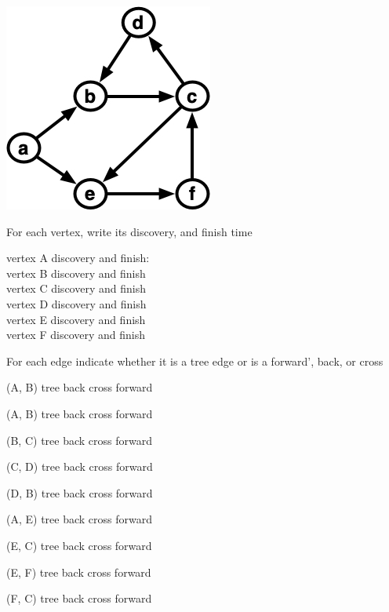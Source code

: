 \vspace{.1in}
\noindent
\begin{minipage}{.45\textwidth}
\begin{center}
  \includegraphics[scale=.45]{media/dfs-numbers.jpg}\\[.2in]
\end{center}
\end{minipage}

\begin{problem}
For each vertex, write its discovery, and finish time


\ask vertex A discovery and  finish: ~~ ~~ 
\\
\ask vertex B  discovery and  finish ~~  ~~ 
\\
\ask vertex C discovery and finish   ~~ ~~ 
\\
\ask vertex D discovery and finish ~~  ~~
\\
\ask vertex E discovery and finish ~ ~~ 
\\
\ask vertex F discovery and finish ~~ ~~ 
\end{problem}


\begin{problem}[9.]

For each edge indicate whether it is a tree edge or is a
forward', back, or cross

\anychoice
(A, B)
\choice* tree
\choice back
\choice cross
\choice forward

\anychoice
(A, B) 
\choice* tree
\choice back
\choice cross
\choice forward

\anychoice (B, C)
\choice* tree
\choice back
\choice cross
\choice forward

\anychoice (C, D)
\choice* tree
\choice back
\choice cross
\choice forward

\anychoice (D, B)
\choice* tree
\choice back
\choice cross
\choice forward

\anychoice (A, E) 
\choice* tree
\choice back
\choice cross
\choice forward

\anychoice (E, C) 
\choice tree
\choice back
\choice* cross
\choice forward

\anychoice (E, F)
\choice* tree
\choice back
\choice cross
\choice forward

\anychoice (F, C) 
\choice tree
\choice back
\choice* cross
\choice forward
\end{problem}

